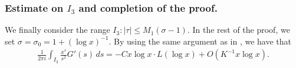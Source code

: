 \documentclass[11pt]{amsart}
\theoremstyle{definition}
\begin{document}
  \subsubsection{Estimate on $I_{3}$ and completion of the proof.}
 We finally consider the range $I_{3}: \vert\tau\vert\leq M_{1}(\sigma-1)$.
 In the rest of the proof, we set $\sigma=\sigma_0=1+(\log x)^{-1}$.
 By using the same argument as in \cite[p. 239]{E79book}, %
 we have that
    \begin{equation}\label{e3}
    \begin{split}
       \frac{1}{2\pi i}\int_{I_{3}}\frac{x^{s}}{s^{2}}G'(s)\,ds=-Cx\log x\cdot L(\log x)+O(K^{-1}x\log x).
    \end{split}
 \end{equation}


\end{document}
